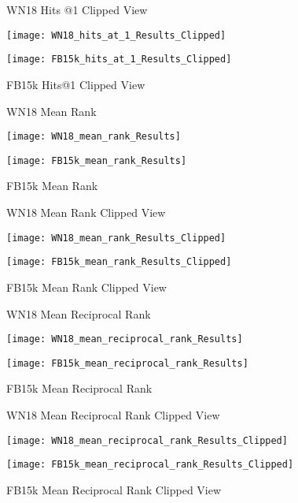 \begin{figure}[H]
	\parbox{.5\linewidth}{
   		\caption{WN18 Hits @1 Clipped View}
   		\centering
    		\texttt{[image: WN18\_hits\_at\_1\_Results\_Clipped]}
		}
	\hfill
	\parbox{.5\linewidth}{
		\caption{FB15k Hits@1  Clipped View}
   		\centering
		\texttt{[image: FB15k\_hits\_at\_1\_Results\_Clipped]}
		}
\end{figure}


\begin{figure}[H]
	\parbox{.5\linewidth}{
   		\caption{WN18 Mean Rank}
   		\centering
    		\texttt{[image: WN18\_mean\_rank\_Results]}
		}
	\hfill
	\parbox{.5\linewidth}{
		\caption{FB15k Mean Rank}
   		\centering
		\texttt{[image: FB15k\_mean\_rank\_Results]}
		}
\end{figure}

\begin{figure}[H]
	\parbox{.5\linewidth}{
   		\caption{WN18 Mean Rank Clipped View}
   		\centering
    		\texttt{[image: WN18\_mean\_rank\_Results\_Clipped]}
		}
	\hfill
	\parbox{.5\linewidth}{
		\caption{FB15k Mean Rank Clipped View}
   		\centering
		\texttt{[image: FB15k\_mean\_rank\_Results\_Clipped]}
		}
\end{figure}


\begin{figure}[H]
	\parbox{.5\linewidth}{
   		\caption{WN18 Mean Reciprocal Rank}
   		\centering
    		\texttt{[image: WN18\_mean\_reciprocal\_rank\_Results]}
		}
	\hfill
	\parbox{.5\linewidth}{
		\caption{FB15k Mean Reciprocal Rank}
   		\centering
		\texttt{[image: FB15k\_mean\_reciprocal\_rank\_Results]}
		}
\end{figure}

\begin{figure}[H]
	\parbox{.5\linewidth}{
   		\caption{WN18 Mean Reciprocal Rank Clipped View}
   		\centering
    		\texttt{[image: WN18\_mean\_reciprocal\_rank\_Results\_Clipped]}
		}
	\hfill
	\parbox{.5\linewidth}{
		\caption{FB15k Mean Reciprocal Rank Clipped View}
   		\centering
		\texttt{[image: FB15k\_mean\_reciprocal\_rank\_Results\_Clipped]}
		}
\end{figure}

